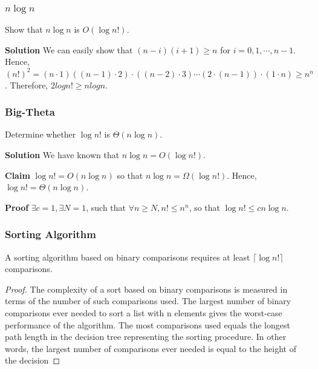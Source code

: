 \documentclass[10pt, compress]{beamer}
\begin{document}
\begin{frame}[fragile]
\frametitle{$n \log n$}
Show that $n \log n$ is $O(\log n!)$.

\textbf{Solution} We
can easily show that $(n - i)(i + 1) \ge n$ for $i = 0, 1, \cdots, n - 1$.
Hence, $(n!)^2 = (n \cdot 1)((n - 1) \cdot 2) \cdot ((n - 2) \cdot 3) \cdots (2 \cdot (n -
1)) \cdot (1 \cdot n) \ge n^n$. Therefore, $2 log n! \ge n log n$.
\end{frame}

\begin{frame}[fragile]
\frametitle{Big-Theta}
Determine whether $\log n!$ is $\Theta(n \log n)$.

\textbf{Solution} We have known that $n \log n = O(\log n!)$.

\textbf{Claim} $\log n! = O(n \log n)$ so that $n \log n = \Omega(\log n!)$. Hence, $\log n! = \Theta(n \log n)$.

\textbf{Proof} $\exists c = 1, \exists N = 1$, such that $\forall n \ge N, n! \le n^n$, so that $\log n! \le c n\log n$.

\end{frame}

\begin{frame}
\frametitle{Sorting Algorithm}
\begin{theorem}
	A sorting algorithm based on binary comparisons requires at least $\lceil \log n! \rceil$ comparisons.
\end{theorem}
\begin{proof}
	The complexity of a sort based on binary comparisons is measured in terms of the number
	of such comparisons used. The largest number of binary comparisons ever needed to sort a list with n elements gives the worst-case performance of the algorithm. The most comparisons used equals the longest path length in the decision tree representing the sorting procedure. In other words, the largest number of comparisons ever needed is equal to the height of the decision
\end{proof}
\end{frame}

\end{document}
